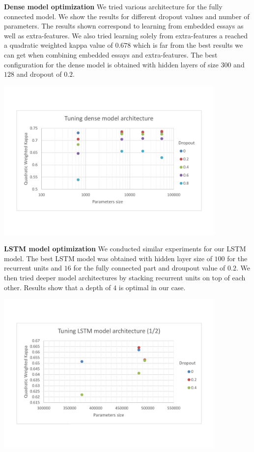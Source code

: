 \documentclass[a4paper,12pt,english]{article}
\begin{document}
\textbf{Dense model optimization} We tried various architecture for the fully connected model. We show the results for different dropout values and number of parameters. The results shown correspond to learning from embedded essays as well as extra-features. We also tried learning solely from extra-features a reached a quadratic weighted kappa value of $0.678$ which is far from the best results we can get when combining embedded essays and extra-features. The best configuration for the dense model is obtained with hidden layers of size $300$ and $128$ and dropout of $0.2$.

\begin{center}
\vspace*{-1.5cm}
\includegraphics[width=0.85\textwidth]{fig/tune_dense_arch.pdf}
\vspace*{-1.5cm}
\end{center}

\textbf{LSTM model optimization} We conducted similar experiments for our LSTM model. The best LSTM model was obtained with hidden layer size of $100$ for the recurrent units and $16$ for the fully connected part and droupout value of $0.2$. We then tried deeper model architectures by stacking recurrent units on top of each other. Results show that a depth of $4$ is optimal in our case.

\begin{center}
\vspace*{-1.5cm}
\includegraphics[width=0.85\textwidth]{fig/tune_lstm_arch_1.pdf}
\vspace*{-1.5cm}
\end{center}
\end{document}
